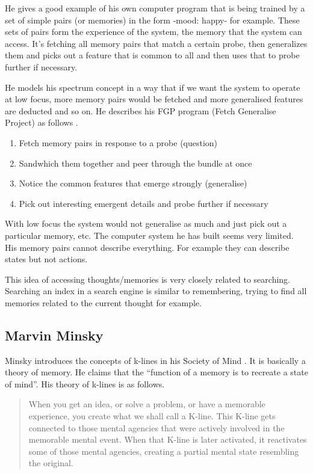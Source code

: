 He gives a good example of his own computer program that is being trained by a set of simple pairs (or memories) in the form -mood: happy- for example. These sets of pairs form the experience of the system, the memory that the system can access. It's fetching all memory pairs that match a certain probe, then generalizes them and picks out a feature that is common to all and then uses that to probe further if necessary.

He models his spectrum concept in a way that if we want the system to operate at low focus, more memory pairs would be fetched and more generalised features are deducted and so on. He describes his FGP program (Fetch Generalise Project) as follows \citep[p.132]{Gelernter1994}.

\begin{enumerate}
  \item Fetch memory pairs in response to a probe (question)
  \item Sandwhich them together and peer through the bundle at once
  \item Notice the common features that emerge strongly (generalise)
  \item Pick out interesting emergent details and probe further if necessary
\end{enumerate}

With low focus the system would not generalise as much and just pick out a particular memory, etc. The computer system he has built seems very limited. His memory pairs cannot describe everything. For example they can describe states but not actions.

This idea of accessing thoughts/memories is very closely related to searching. Searching an index in a search engine is similar to remembering, trying to find all memories related to the current thought for example.

\subsection{Marvin Minsky}

Minsky introduces the concepts of k-lines in his Society of Mind \citep{Minsky1980, Minsky1988}. It is basically a theory of memory. He claims that the ``function of a memory is to recreate a state of mind''. His theory of k-lines is as follows.

\begin{quote}
  When you get an idea, or solve a problem, or have a memorable experience, you create what we shall call a K-line. This K-line gets connected to those mental agencies that were actively involved in the memorable mental event. When that K-line is later activated, it reactivates some of those mental agencies, creating a partial mental state resembling the original. \citep{Minsky1980, Minsky1988}
\end{quote}

